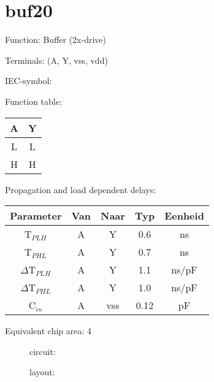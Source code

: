 
\section{buf20}

Function: Buffer (2x-drive)

Terminals: (A, Y, vss, vdd)


IEC-symbol:
\begin{figure}[bth]
\end{figure}

Function table:
\begin{table}[bth]
\begin{tabular}{|c||c|}
\hline
A	&Y\\
\hline
L	&L\\
H	&H\\
\hline
\end{tabular}

\vspace{1cm}

Propagation and load dependent delays:\\

\begin{tabular}{|c|c|c|c|c|}
\hline
Parameter               &Van            &Naar   &Typ    &Eenheid\\
\hline
T$_{PLH}$               &A     		&Y      &0.6    &ns\\
T$_{PHL}$               &A    		&Y      &0.7    &ns\\
\hline
$\Delta$T$_{PLH}$       &A           	&Y      &1.1    &ns/pF\\
$\Delta$T$_{PHL}$       &A           	&Y      &1.0    &ns/pF\\
\hline
C$_{in}$                &A	    	&vss    &0.12   &pF\\
\hline
\end{tabular}
\end{table}

Equivalent chip area: 4


\clearpage


\begin{figure}[bth]
circuit:\\

\end{figure}



\begin{figure}[bth]
layout:\\

\end{figure}

\clearpage
